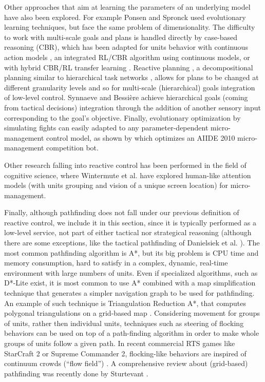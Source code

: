 \documentclass[journal]{IEEEtran}
\begin{document}
Other approaches that aim at learning the parameters of an underlying model have also been explored. For example Ponsen and Spronck \cite{GA} used evolutionary learning techniques, but face the same problem of dimensionality. The difficulty to work with multi-scale goals and plans is handled directly by case-based reasoning (CBR), which has been adapted for units behavior with continuous action models \cite{Molineaux08}, an integrated RL/CBR algorithm using continuous models, or with hybrid CBR/RL transfer learning \cite{CBR-RL}. Reactive planning \cite{WeberCig10}, a decompositional planning similar to hierarchical task networks \cite{HTNPlanning}, allows for plans to be changed at different granularity levels and so for multi-scale (hierarchical) goals integration of low-level control. Synnaeve and Bessi\`{e}re \cite{SynnaeveMicroCig11} achieve hierarchical goals (coming from tactical decisions) integration through the addition of another sensory input corresponding to the goal's objective. Finally, evolutionary optimization by simulating fights can easily adapted to any parameter-dependent micro-management control model, as shown by \cite{OthmanSimu} which optimizes an AIIDE 2010 micro-management competition bot.


Other research falling into reactive control has been performed in the field of cognitive science, where Wintermute et al. \cite{SORTS} have explored human-like attention models (with units grouping and vision of a unique screen location) for micro-management.

Finally, although pathfinding does not fall under our previous definition of reactive control, we include it in this section, since it is typically performed as a low-level service, not part of either tactical nor strategical reasoning (although there are some exceptions, like the tactical pathfinding of Danielsiek et al. \cite{Danielsiek_2008}). The most common pathfinding algorithm is A*, but its big problem is CPU time and memory consumption, hard to satisfy in a complex, dynamic, real-time environment with large numbers of units. Even if specialized algorithms, such as D*-Lite \cite{KoenigL02} exist, it is most common to use A* combined with a map simplification technique that generates a simpler navigation graph to be used for pathfinding. An example of such technique is Triangulation Reduction A*, that computes polygonal triangulations on a grid-based map \cite{Demyen_2006}. Considering movement for groups of units, rather then individual units, techniques such as steering of flocking behaviors \cite{Reynolds_1999} can be used on top of a path-finding algorithm in order to make whole groups of units follow a given path. In recent commercial RTS games like StarCraft 2 or Supreme Commander 2, flocking-like behaviors are inspired of continuum crowds (``flow field'') \cite{Treuille2006}. A comprehensive review about (grid-based) pathfinding was recently done by Sturtevant \cite{sturtevant2012benchmarks}.
\end{document}
